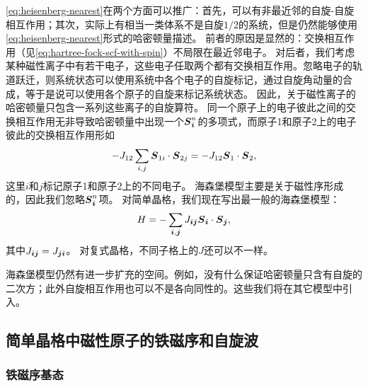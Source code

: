 \eqref{eq:heisenberg-nearest}在两个方面可以推广：首先，可以有非最近邻的自旋-自旋相互作用；其次，实际上有相当一类体系不是自旋$1/2$的系统，但是仍然能够使用\eqref{eq:heisenberg-nearest}形式的哈密顿量描述。
前者的原因是显然的：交换相互作用（见\eqref{eq:hartree-fock-scf-with-spin}）不局限在最近邻电子。
对后者，我们考虑某种磁性离子中有若干电子，这些电子任取两个都有交换相互作用。忽略电子的轨道跃迁，则系统状态可以使用系统中各个电子的自旋标记，通过自旋角动量的合成，等于是说可以使用各个原子的自旋来标记系统状态。
因此，关于磁性离子的哈密顿量只包含一系列这些离子的自旋算符。
同一个原子上的电子彼此之间的交换相互作用无非导致哈密顿量中出现一个$\vb*{S}_{\vb*{i}}^n$的多项式，而原子1和原子2上的电子彼此的交换相互作用形如
\[
    - J_{12} \sum_{i, j} \vb*{S}_{1i} \cdot \vb*{S}_{2j} = - J_{12} \vb*{S}_1 \cdot \vb*{S}_2,
\]
这里$i$和$j$标记原子1和原子2上的不同电子。
海森堡模型主要是关于磁性序形成的，因此我们忽略$\vb*{S}_{\vb*{i}}^n$项。
对简单晶格，我们现在写出最一般的海森堡模型：
\begin{equation}
    H = - \sum_{\vb*{i}, \vb*{j}} J_{\vb*{i} \vb*{j}} \vb*{S}_{\vb*{i}} \cdot \vb*{S}_{\vb*{j}},
\end{equation}
其中$J_{\vb*{i} \vb*{j}} = J_{\vb*{j} \vb*{i}}$。
对复式晶格，不同子格上的$J$还可以不一样。

海森堡模型仍然有进一步扩充的空间。例如，没有什么保证哈密顿量只含有自旋的二次方；此外自旋相互作用也可以不是各向同性的。这些我们将在其它模型中引入。

\subsection{简单晶格中磁性原子的铁磁序和自旋波}

\subsubsection{铁磁序基态}

